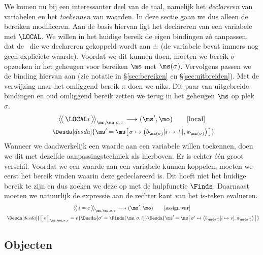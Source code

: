 We komen nu bij een interessanter deel van de taal, namelijk het \emph{declareren} van variabelen en het \emph{toekennen} van waarden. In deze sectie gaan we dus alleen de bereiken modificeren. Aan de basis hiervan ligt het declareren van een variabele met $\LOCAL$. We willen in het huidige bereik de eigen bindingen zó aanpassen, dat de \Id\ die we declareren gekoppeld wordt aan $\nil$ (de variabele bevat immers nog geen expliciete waarde). Voordat we dit kunnen doen, moeten we bereik $\sigma$ opzoeken in het geheugen voor bereiken $\ms$ met $\ms(\sigma)$. Vervolgens passen we de binding hiervan aan (zie notatie in §\ref{sec:bereiken} en §\ref{sec:uitbreiden}). Met de verwijzing naar het omliggend bereik $\pi$ doen we niks. Dit paar van uitgebreide bindingen en oud omliggend bereik zetten we terug in het geheugen $\ms$ op plek $\sigma$.
%
\begin{gather*}
  \Config{\LOCAL i}{\ms, \mo, \sigma, \tau}
  \longrightarrow
  (\ms', \mo)
  \tag*{[local]} \\
  \Desdas{
    \Desda[desda]{\ms' = \ms \surr{ \sigma \mapsto \big(b_{\ms(\sigma)}[i \mapsto \BOT], \pi_{\ms(\sigma)}\big) }}
  }
\end{gather*}
%
Wanneer we daadwerkelijk een waarde aan een variabele willen toekennen, doen we dit met dezelfde aanpassingstechniek als hierboven. Er is echter één groot verschil. Voordat we een waarde aan een variabele kunnen koppelen, moeten we eerst het bereik vinden waarin deze gedeclareerd is. Dit hoeft niet het huidige bereik te zijn en dus zoeken we deze op met de hulpfunctie $\Finds$. Daarnaast moeten we natuurlijk de expressie aan de rechter kant van het is-teken evalueren.
%
\begin{gather*}
  \Config{i = e}{\ms, \mo, \sigma, \tau}
  \longrightarrow
  (\ms', \mo)
  \tag*{[assign var]} \\
  \Desdas{
    \Desda[desda]{\Express{e}{\ms, \mo, \sigma, \tau} = v}
    \Desda{\sigma' = \Finds(\ms, \sigma, i)}
    \Desda{\ms'= \ms \surr{ \sigma' \mapsto \big(b_{\ms(\sigma')}[ i \mapsto v ], \pi_{\ms(\sigma')}\big) }}
  }
\end{gather*}

\subsection{Objecten}

